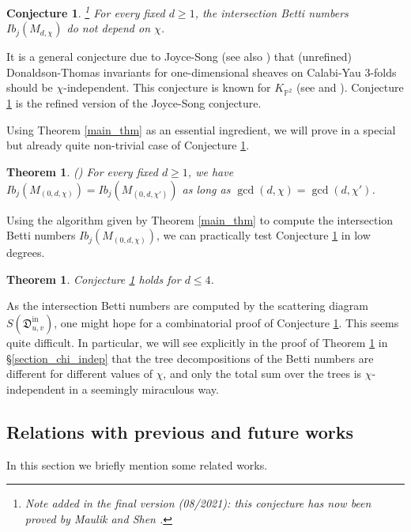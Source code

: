 \documentclass[12pt, a4paper]{amsart}
\newtheorem{thm}[defn]{Theorem}
\newtheorem{conj}[defn]{Conjecture}
\newcommand\PP{\mathbb P}
\newcommand\fD{\mathfrak D}
\newcommand\iin{\mathrm{in}}
\begin{document}
\begin{conj}\footnote{Note added in the final version (08/2021): this conjecture has now been proved by Maulik and Shen \cite{MS20}.} \label{conj_chi_indep}
For every fixed $d \geqslant1$, the intersection Betti numbers $Ib_j(M_{d,\chi})$ do not depend on $\chi$.
\end{conj}

It is a general conjecture due to Joyce-Song \cite[Conjecture 6.20]{MR2951762}
(see also \cite[Conjecture 6.3]{MR2892766}) that (unrefined) Donaldson-Thomas invariants for one-dimensional sheaves on Calabi-Yau 3-folds should be $\chi$-independent.
This conjecture is known for $K_{\PP^2}$ (see \cite[Appendix A]{MR3861701}
and \cite{bousseau2019takahashi}). Conjecture \ref{conj_chi_indep} is the refined version of the Joyce-Song conjecture. 

Using Theorem \ref{main_thm} as an essential ingredient, we will prove in \cite{bousseau2019takahashi} a special but already quite non-trivial case of 
Conjecture \ref{conj_chi_indep}.

\begin{thm}(\cite[Theorem 0.5.2]{bousseau2019takahashi}) \label{thm_chi_indep_gcd}
For every fixed $d \geqslant1$, we have $Ib_j(M_{(0,d,\chi)})=Ib_j(M_{(0,d,\chi')})$
as long as $\gcd(d,\chi)=\gcd(d,\chi')$.
\end{thm}

Using the algorithm given by Theorem \ref{main_thm} to compute the intersection Betti numbers $Ib_j(M_{(0,d,\chi)})$, we can practically test Conjecture \ref{conj_chi_indep}
in low degrees.

\begin{thm} \label{thm_chi_indep_test}
Conjecture \ref{conj_chi_indep} holds for $d \leq 4$.
\end{thm}

As the intersection Betti numbers are computed by the scattering diagram 
$S(\fD_{u,v}^{\iin})$, one might hope for a combinatorial proof of Conjecture 
\ref{conj_chi_indep}. This seems quite difficult. In particular, we will see explicitly in the proof of Theorem \ref{thm_chi_indep_test}
in \S \ref{section_chi_indep}
that the
tree decompositions of the Betti numbers are different for different values of $\chi$, and only the total sum over the trees is $\chi$-independent in a seemingly miraculous way.




\subsection{Relations with previous and future works}
\label{section_intro_relation}
In this section we briefly mention some related works.
\end{document}
